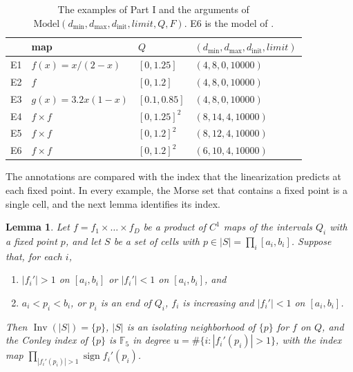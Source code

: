 \documentclass[11pt]{article}
\theoremstyle{plain}
\newtheorem{lemma}[proposition]{Lemma}
\theoremstyle{definition}
\theoremstyle{remark}
\DeclareMathOperator{\Inv}{Inv}
\DeclareMathOperator{\sign}{sign}
\newcommand{\F}{\mathbb{F}_5}
\newcommand{\dmin}{d_{\min}}
\newcommand{\dmax}{d_{\max}}
\newcommand{\dinit}{d_{\mathrm{init}}}
\begin{document}
\begin{table}[tbp]
\centering
\caption{The examples of Part I and the arguments of $\mathrm{Model}(\dmin,\dmax,\dinit,\mathit{limit},Q,F)$. E6 is the model of .}\label{tab:examples}
\begin{tabular}{llll}
\toprule
 & map & $Q$ & $(\dmin,\dmax,\dinit,\mathit{limit})$ \\
\midrule
E1 & $f(x)=x/(2-x)$ & $[0,1.25]$ & $(4,8,0,10000)$ \\
E2 & $f$ & $[0,1.2]$ & $(4,8,0,10000)$ \\
E3 & $g(x)=3.2x(1-x)$ & $[0.1,0.85]$ & $(4,8,0,10000)$ \\
E4 & $f\times f$ & $[0,1.25]^2$ & $(8,14,4,10000)$ \\
E5 & $f\times f$ & $[0,1.2]^2$ & $(8,12,4,10000)$ \\
E6 & $f\times f$ & $[0,1.2]^2$ & $(6,10,4,10000)$ \\
\bottomrule
\end{tabular}
\end{table}

The annotations are compared with the index that the linearization predicts at each fixed point. In every example, the Morse set that contains a fixed point is a single cell, and the next lemma identifies its index.

\begin{lemma}\label{lem:linear}
Let $f=f_1\times\dots\times f_D$ be a product of $C^1$ maps of the intervals $Q_i$ with a fixed point $p$, and let $S$ be a set of cells with $p\in|S|=\prod_i[a_i,b_i]$. Suppose that, for each $i$,
\begin{enumerate}[label=(\alph*)]
\item $|f_i'|>1$ on $[a_i,b_i]$ or $|f_i'|<1$ on $[a_i,b_i]$, and
\item $a_i<p_i<b_i$, or $p_i$ is an end of $Q_i$, $f_i$ is increasing and $|f_i'|<1$ on $[a_i,b_i]$.
\end{enumerate}
Then $\Inv(|S|)=\{p\}$, $|S|$ is an isolating neighborhood of $\{p\}$ for $f$ on $Q$, and the Conley index of $\{p\}$ is $\F$ in degree $u=\#\{i:|f_i'(p_i)|>1\}$, with the index map $\prod_{|f_i'(p_i)|>1}\sign f_i'(p_i)$.
\end{lemma}
\end{document}
